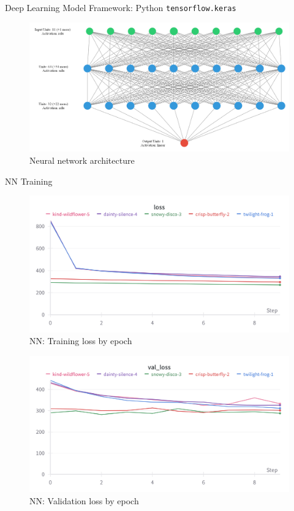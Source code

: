 \documentclass{beamer}
\begin{document}
\begin{frame}{Deep Learning Model}
    Framework: Python \texttt{tensorflow.keras} \\
    \begin{figure}
        \includegraphics[width=\textwidth]{../figures/nn.png}
        \caption{Neural network architecture}
    \end{figure}
\end{frame}

\begin{frame}{NN Training}

\begin{figure}
    \includegraphics[width=\textwidth]{../figures/wandb_loss_0.png}
    \caption{NN: Training loss by epoch}
\end{figure}

\end{frame}

\begin{frame}
    \begin{figure}
        \includegraphics[width=\textwidth]{../figures/wandb_val_loss_0.png}
        \caption{NN: Validation loss by epoch}
    \end{figure}
\end{frame}
\end{document}
